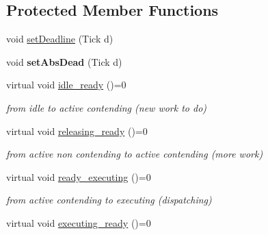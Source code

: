 \subsection*{Protected Member Functions}
\begin{DoxyCompactItemize}
\item 
void \hyperlink{classRTSim_1_1Server_afbff2b557af29929f2efe7276a7e59f3}{set\+Deadline} (Tick d)
\item 
void {\bfseries set\+Abs\+Dead} (Tick d)\hypertarget{classRTSim_1_1Server_aba639f850c6a203420cd1646c6002e50}{}\label{classRTSim_1_1Server_aba639f850c6a203420cd1646c6002e50}

\item 
virtual void \hyperlink{classRTSim_1_1Server_abb729daadacd051298c7f6253768b210}{idle\+\_\+ready} ()=0\hypertarget{classRTSim_1_1Server_abb729daadacd051298c7f6253768b210}{}\label{classRTSim_1_1Server_abb729daadacd051298c7f6253768b210}

\begin{DoxyCompactList}\small\item\em from idle to active contending (new work to do) \end{DoxyCompactList}\item 
virtual void \hyperlink{classRTSim_1_1Server_a78aa1f552cedc5ffa5fadb7179e202aa}{releasing\+\_\+ready} ()=0\hypertarget{classRTSim_1_1Server_a78aa1f552cedc5ffa5fadb7179e202aa}{}\label{classRTSim_1_1Server_a78aa1f552cedc5ffa5fadb7179e202aa}

\begin{DoxyCompactList}\small\item\em from active non contending to active contending (more work) \end{DoxyCompactList}\item 
virtual void \hyperlink{classRTSim_1_1Server_a2eadb672decdb878ae62146dc3698c83}{ready\+\_\+executing} ()=0\hypertarget{classRTSim_1_1Server_a2eadb672decdb878ae62146dc3698c83}{}\label{classRTSim_1_1Server_a2eadb672decdb878ae62146dc3698c83}

\begin{DoxyCompactList}\small\item\em from active contending to executing (dispatching) \end{DoxyCompactList}\item 
virtual void \hyperlink{classRTSim_1_1Server_a529f73c8ba22c742a819dfdae113f0c1}{executing\+\_\+ready} ()=0\hypertarget{classRTSim_1_1Server_a529f73c8ba22c742a819dfdae113f0c1}{}\label{classRTSim_1_1Server_a529f73c8ba22c742a819dfdae113f0c1}


\end{DoxyCompactItemize}
